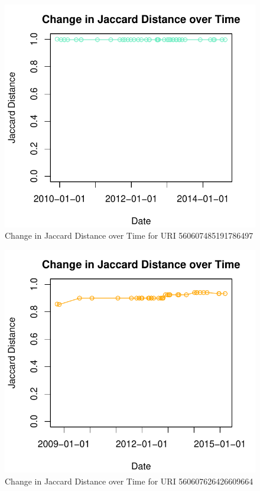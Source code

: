 \documentclass[a4paper,12pt]{article}
\begin{document}
\begin{figure}[H]
    \centering
    \includegraphics{stats/q3/560607485191786497.pdf}
    \caption{Change in Jaccard Distance over Time for URI 560607485191786497}
\end{figure}

\begin{figure}[H]
    \centering
    \includegraphics{stats/q3/560607626426609664.pdf}
    \caption{Change in Jaccard Distance over Time for URI 560607626426609664}
\end{figure}
\end{document}
